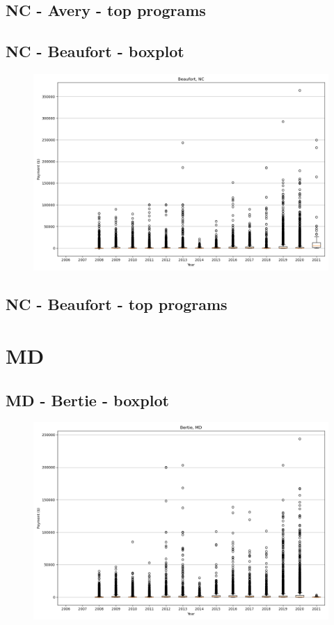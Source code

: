 \subsection*{NC - Avery - top programs}

\newpage
\subsection*{NC - Beaufort - boxplot}
\begin{figure}[h]
\centering
\includegraphics[width=7in]{../output/boxplots/counties/Beaufort-NC_boxplot.png}
\end{figure}


\subsection*{NC - Beaufort - top programs}

\newpage
\section*{MD}
\subsection*{MD - Bertie - boxplot}
\begin{figure}[h]
\centering
\includegraphics[width=7in]{../output/boxplots/counties/Bertie-MD_boxplot.png}
\end{figure}


